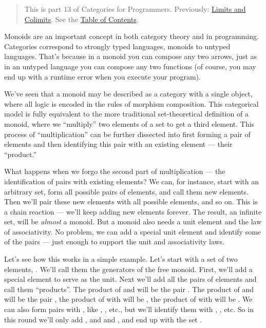 \begin{quote}
This is part 13 of Categories for Programmers. Previously:
\href{https://bartoszmilewski.com/2015/04/15/limits-and-colimits/}{Limits
and Colimits}. See the
\href{https://bartoszmilewski.com/2014/10/28/category-theory-for-programmers-the-preface/}{Table
of Contents}.
\end{quote}

Monoids are an important concept in both category theory and in
programming. Categories correspond to strongly typed languages, monoids
to untyped languages. That's because in a monoid you can compose any two
arrows, just as in an untyped language you can compose any two functions
(of course, you may end up with a runtime error when you execute your
program).

We've seen that a monoid may be described as a category with a single
object, where all logic is encoded in the rules of morphism composition.
This categorical model is fully equivalent to the more traditional
set-theoretical definition of a monoid, where we ``multiply'' two
elements of a set to get a third element. This process of
``multiplication'' can be further dissected into first forming a pair of
elements and then identifying this pair with an existing element ---
their ``product.''

What happens when we forgo the second part of multiplication --- the
identification of pairs with existing elements? We can, for instance,
start with an arbitrary set, form all possible pairs of elements, and
call them new elements. Then we'll pair these new elements with all
possible elements, and so on. This is a chain reaction --- we'll keep
adding new elements forever. The result, an infinite set, will be
\emph{almost} a monoid. But a monoid also needs a unit element and the
law of associativity. No problem, we can add a special unit element and
identify some of the pairs --- just enough to support the unit and
associativity laws.

Let's see how this works in a simple example. Let's start with a set of
two elements, . We'll call them the generators of the
free monoid. First, we'll add a special element  to serve as
the unit. Next we'll add all the pairs of elements and call them
``products''. The product of  and  will be the pair
. The product of  and  will be the
pair , the product of  with  will be
, the product of  with  will be
. We can also form pairs with , like
, , etc., but we'll identify them with
, , etc. So in this round we'll only add
,  and  and
, and end up with the set
.


